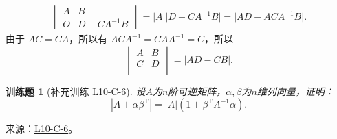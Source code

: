 \documentclass[UTF8,12pt,a4paper,fontset=fandol]{ctexart}
\newtheorem{exercise}{训练题}[section]
\begin{document}
\begin{solve}
\begin{align*}
\begin{vmatrix}
                            A & B          \\
                            O & D-CA^{-1}B
                        \end{vmatrix}
                = \lvert A \rvert \lvert D-CA^{-1}B \rvert = \lvert AD-ACA^{-1}B \rvert.
            \end{align*} 由于 $AC = CA$，所以有 $ACA^{-1} = CAA^{-1} = C$，所以
            \[\begin{vmatrix}
                    A & B \\
                    C & D \\
                \end{vmatrix} = \lvert AD-CB \rvert.\]
\end{solve}

\begin{exercise}[补充训练 L10-C-6]\label{prob:L10-C-6}
设$A$为$n$阶可逆矩阵，$\alpha,\beta$为$n$维列向量，证明：
        \[|A+\alpha\beta^{\mathrm{T}}|=|A|(1+\beta^\mathrm{T}A^{-1}\alpha).\]
\end{exercise}
\noindent 来源：\href{https://github.com/yhwu-is/Linear-Algebra-Left-Undone/blob/new/%E8%AE%B2%E4%B9%89/%E4%B8%93%E9%A2%98/10%20%E8%A1%8C%E5%88%97%E5%BC%8F.tex}{L10-C-6}。
\end{document}

